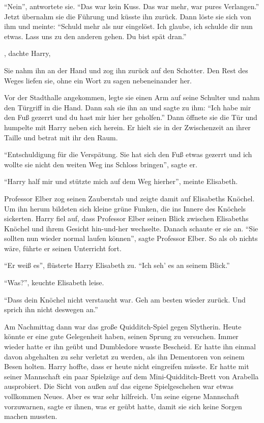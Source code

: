 \enquote{Nein}, antwortete sie. \enquote{Das war kein Kuss. Das war mehr, war pures Verlangen.} Jetzt übernahm sie die Führung und küsste ihn zurück. Dann löste sie sich von ihm und meinte: \enquote{Schuld mehr als nur eingelöst. Ich glaube, ich schulde dir nun etwas. Lass uns zu den anderen gehen. Du bist spät dran.}

, dachte Harry, 

Sie nahm ihn an der Hand und zog ihn zurück auf den Schotter. Den Rest des Weges liefen sie, ohne ein Wort zu sagen nebeneinander her.

Vor der Stadthalle angekommen, legte sie einen Arm auf seine Schulter und nahm den Türgriff in die Hand. Dann sah sie ihn an und sagte zu ihm: \enquote{Ich habe mir den Fuß gezerrt und du hast mir hier her geholfen.} Dann öffnete sie die Tür und humpelte mit Harry neben sich herein. Er hielt sie in der Zwischenzeit an ihrer Taille und betrat mit ihr den Raum.

\enquote{Entschuldigung für die Verspätung. Sie hat sich den Fuß etwas gezerrt und ich wollte sie nicht den weiten Weg ins Schloss bringen}, sagte er.

\enquote{Harry half mir und stützte mich auf dem Weg hierher}, meinte Elisabeth.

Professor Elber zog seinen Zauberstab und zeigte damit auf Elisabeths Knöchel. Um ihn herum bildeten sich kleine grüne Funken, die ins Innere des Knöchels sickerten. Harry fiel auf, dass Professor Elber seinen Blick zwischen Elisabeths Knöchel und ihrem Gesicht hin-und-her wechselte. Danach schaute er sie an. \enquote{Sie sollten nun wieder normal laufen können}, sagte Professor Elber. So als ob nichts wäre, führte er seinen Unterricht fort.

\enquote{Er weiß es}, flüsterte Harry Elisabeth zu. \enquote{Ich seh' es an seinem Blick.}

\enquote{Was?}, keuchte Elisabeth leise.

\enquote{Dass dein Knöchel nicht verstaucht war. Geh am besten wieder zurück. Und sprich ihn nicht deswegen an.}

Am Nachmittag dann war das große Quidditch-Spiel gegen Slytherin. Heute könnte er eine gute Gelegenheit haben, seinen Sprung zu versuchen. Immer wieder hatte er ihn geübt und Dumbledore wusste Bescheid. Er hatte ihn einmal davon abgehalten zu sehr verletzt zu werden, als ihn Dementoren von seinem Besen holten. Harry hoffte, dass er heute nicht eingreifen müsste. Er hatte mit seiner Mannschaft ein paar Spielzüge auf dem Mini-Quidditch-Brett von Arabella ausprobiert. Die Sicht von außen auf das eigene Spielgeschehen war etwas vollkommen Neues. Aber es war sehr hilfreich. Um seine eigene Mannschaft vorzuwarnen, sagte er ihnen, was er geübt hatte, damit sie sich keine Sorgen machen mussten.

